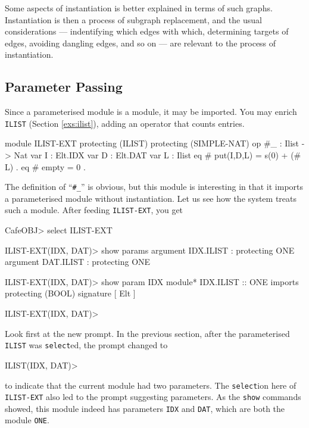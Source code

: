 \documentclass[a4paper]{memoir}
\begin{document}
Some aspects of instantiation is better explained in terms of such graphs.
Instantiation is then a process of subgraph replacement, and the
usual considerations --- indentifying which edges with which,
determining targets of edges, avoiding dangling edges, and so on --- are
relevant to the process of instantiation.

\subsection{Parameter Passing}

Since a parameterised module is a module, it may be imported.
You may enrich \verb|ILIST| (Section \ref{exs:ilist}), adding
an operator that counts entries.
\begin{vvtm}
\begin{ccode}
  module ILIST-EXT {
    protecting (ILIST)
    protecting (SIMPLE-NAT)
    op #_ : Ilist -> Nat
    var I : Elt.IDX
    var D : Elt.DAT
    var L : Ilist
    eq # put(I,D,L) = s(0) + (# L) .
    eq # empty = 0 .
  }
\end{ccode}
\end{vvtm}
The definition of ``\verb|#_|'' is obvious, but this module is
interesting in that it imports a parameterised module without
instantiation. Let us see how the system treats such a module.
After feeding \verb|ILIST-EXT|, you get
\begin{vvtm}
\begin{ccode}
  CafeOBJ> select ILIST-EXT

  ILIST-EXT(IDX, DAT)> show params
  argument IDX.ILIST : protecting ONE
  argument DAT.ILIST : protecting ONE

  ILIST-EXT(IDX, DAT)> show param IDX
  module* IDX.ILIST :: ONE {
    imports {
      protecting (BOOL)
    }
    signature {
      [ Elt ]
    }
  }

  ILIST-EXT(IDX, DAT)> 
\end{ccode}
\end{vvtm}
Look first at the new prompt. In the previous section, after
the parameterised \verb|ILIST| was \verb|select|ed, the prompt
changed to
\begin{vvtm}
\begin{ccode}
  ILIST(IDX, DAT)> 
\end{ccode}
\end{vvtm}
to indicate that the current module had two parameters. The \verb|select|ion
here of \verb|ILIST-EXT| also led to the prompt suggesting parameters.
As the \verb|show| commands showed, this module indeed has parameters
\verb|IDX| and \verb|DAT|, which are both the module \verb|ONE|.
\end{document}
